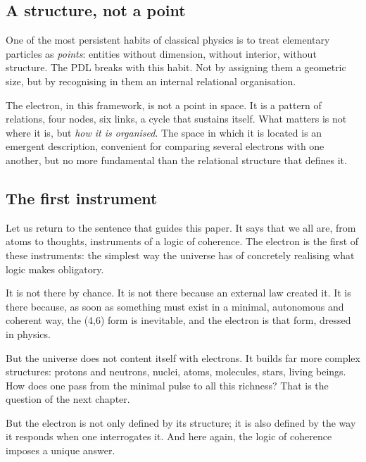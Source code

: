 \documentclass[12pt, a4paper, openright]{book}
\begin{document}
\subsection*{A structure, not a point}

One of the most persistent habits of classical physics is to treat elementary particles as \emph{points}: entities without dimension, without interior, without structure. The PDL breaks with this habit. Not by assigning them a geometric size, but by recognising in them an internal relational organisation.

\medskip

The electron, in this framework, is not a point in space. It is a pattern of relations, four nodes, six links, a cycle that sustains itself. What matters is not where it is, but \emph{how it is organised}. The space in which it is located is an emergent description, convenient for comparing several electrons with one another, but no more fundamental than the relational structure that defines it.

\subsection*{The first instrument}

Let us return to the sentence that guides this paper. It says that we all are, from atoms to thoughts, instruments of a logic of coherence. The electron is the first of these instruments: the simplest way the universe has of concretely realising what logic makes obligatory.

\medskip

It is not there by chance. It is not there because an external law created it. It is there because, as soon as something must exist in a minimal, autonomous and coherent way, the (4,6) form is inevitable, and the electron is that form, dressed in physics.

\medskip

But the universe does not content itself with electrons. It builds far more complex structures: protons and neutrons, nuclei, atoms, molecules, stars, living beings. How does one pass from the minimal pulse to all this richness? That is the question of the next chapter.

\medskip

But the electron is not only defined by its structure; it is also defined by the way it responds when one interrogates it. And here again, the logic of coherence imposes a unique answer.
\end{document}
